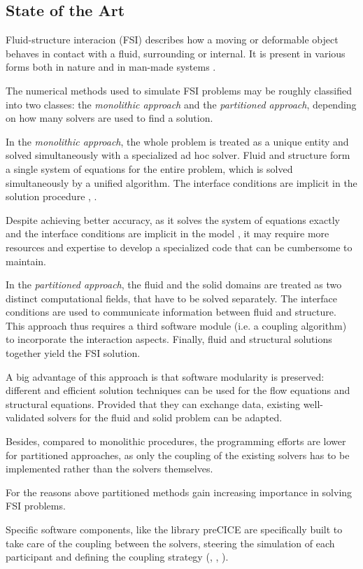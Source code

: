 \subsection*{State of the Art}

Fluid-structure interacion (FSI) describes how a moving or deformable object behaves in contact with a fluid, surrounding or internal. It is present in various forms both in nature and in man-made systems \cite{ZIENKIEWICZ2014423}.

The numerical methods used to simulate FSI problems may be roughly classified into two classes: the \textit{monolithic approach} and the \textit{partitioned approach}, depending on how many solvers are used to find a solution.

In the \textit{monolithic approach}, the whole problem is treated as a unique entity and solved simultaneously with a specialized ad hoc solver. Fluid and structure form a single system of equations for the entire problem, which is solved simultaneously by a unified algorithm. The interface conditions are implicit in the solution procedure \cite{hubner2004monolithic}, \cite{ryzhakov2010monolithic}.

Despite achieving better accuracy, as it solves the system of equations exactly and the interface conditions are implicit in the model \cite{richter2017fluid}, it may require more resources and expertise to develop a specialized code that can be cumbersome to maintain.

In the \textit{partitioned approach}, the fluid and the solid domains are treated as two distinct computational fields, that have to be solved separately. The interface conditions are used to communicate information between fluid and structure\cite{degroote2009performance}. This approach thus requires a third software module (i.e. a coupling algorithm) to incorporate the interaction aspects. Finally, fluid and structural solutions together yield the FSI solution.

A big advantage of this approach is that software modularity is preserved: different and efficient solution techniques can be used for the flow equations and structural equations. Provided that they can exchange data, existing well-validated solvers for the fluid and solid problem can be adapted.

Besides, compared to monolithic procedures, the programming efforts are lower for partitioned approaches, as only the coupling of the existing solvers has to be implemented rather than the solvers themselves.

For the reasons above partitioned methods gain increasing importance in solving FSI problems. 

Specific software components, like the library preCICE \cite{bungartz2016precice} are specifically built to take care of the coupling between the solvers, steering the simulation of each participant and defining the coupling strategy (\cite{hou2012numerical}, \cite{degroote2009performance}, \cite{mehl2016parallel}). 

